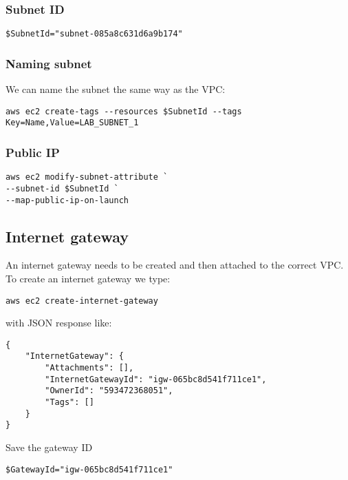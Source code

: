 \subsubsection{Subnet ID}

\begin{verbatim}
$SubnetId="subnet-085a8c631d6a9b174"
\end{verbatim}

\subsubsection{Naming subnet}

We can name the subnet the same way as the VPC:

\begin{verbatim}
aws ec2 create-tags --resources $SubnetId --tags Key=Name,Value=LAB_SUBNET_1
\end{verbatim}

\subsubsection{Public IP}

\begin{verbatim}
aws ec2 modify-subnet-attribute `
--subnet-id $SubnetId `
--map-public-ip-on-launch
\end{verbatim}

\subsection{Internet gateway}\label{internet-gateway}

An internet gateway needs to be created and then attached to the correct
VPC. To create an internet gateway we type:

\begin{verbatim}
aws ec2 create-internet-gateway
\end{verbatim}

with JSON response like:

\begin{verbatim}
{
    "InternetGateway": {
        "Attachments": [],
        "InternetGatewayId": "igw-065bc8d541f711ce1",
        "OwnerId": "593472368051",
        "Tags": []
    }
}
\end{verbatim}

Save the gateway ID
\begin{verbatim}
$GatewayId="igw-065bc8d541f711ce1"
\end{verbatim}


